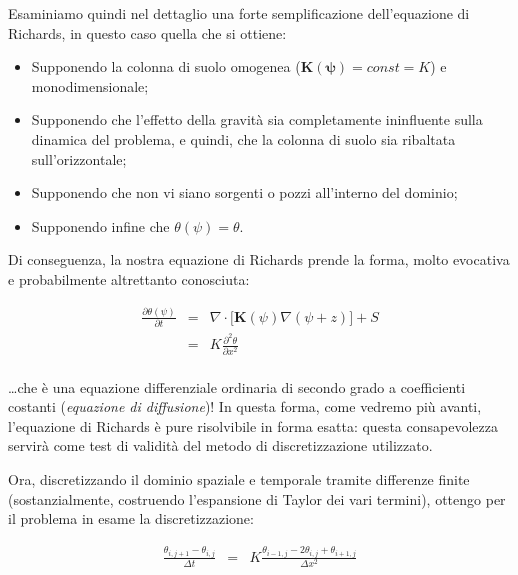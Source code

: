 \documentclass[11pt]{amsart}
\theoremstyle{definition}
\theoremstyle{remark}
\numberwithin{equation}{section}
\begin{document}
Esaminiamo quindi nel dettaglio una forte semplificazione dell'equazione di Richards, in questo caso quella che si ottiene:

\begin{itemize}
 \item Supponendo la colonna di suolo omogenea ($\mathbf{K(\psi)} = const = K$) e monodimensionale;
 \item Supponendo che l'effetto della gravità sia completamente ininfluente sulla dinamica del problema, e quindi, che la colonna di suolo sia ribaltata
 sull'orizzontale;
 \item Supponendo che non vi siano sorgenti o pozzi all'interno del dominio;
 \item Supponendo infine che $\theta(\psi) = \theta$.
\end{itemize}

Di conseguenza, la nostra equazione di Richards prende la forma, molto evocativa e probabilmente altrettanto conosciuta:

\begin{equation}
\label{eq:rich_sim}
\begin{align}
\frac{\partial \theta(\psi)}{\partial t} & = & \nabla\cdot\lbrack \textbf{K}(\psi)\nabla(\psi + z) \rbrack + S \\
		& = & K \frac{\partial^{2} \theta}{\partial x^{2}}  \\
\end{align}   
\end{equation}

\dots che è una equazione differenziale ordinaria di secondo grado a coefficienti costanti (\emph{equazione di diffusione})! In questa forma, come vedremo più avanti,
l'equazione di Richards è pure risolvibile in forma esatta: questa consapevolezza servirà come test di validità del metodo di discretizzazione utilizzato.

Ora, discretizzando il dominio spaziale e temporale tramite differenze finite (sostanzialmente, costruendo l'espansione di Taylor dei vari termini), ottengo per il problema in esame la discretizzazione:

\begin{equation}
\label{eq:rich_sim_discr}
\begin{align}
\frac{\theta_{i,j+1}-\theta_{i,j}}{\Delta t} & = & K \frac{\theta_{i-1,j} - 2\theta_{i,j} + \theta_{i+1,j}}{\Delta x^{2}} \\
\end{align}
\end{equation}
\end{document}
